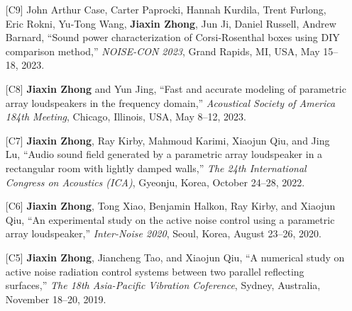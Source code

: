 \documentclass[10pt,a4paper,ragged2e,withhyper]{altacv}
\newcommand{\PubConference}[1]{\textit{#1}}
\newcommand{\PubTitle}[1]{``{#1,}''}
\newcommand{\PubMe}[1]{\textbf{#1}}
\begin{document}
\divider

\newpage
{}

\begin{itemize}[leftmargin = 25pt]
    \item [{[C9]}]
        John Arthur Case, Carter Paprocki, Hannah Kurdila, Trent Furlong, Eric Rokni, Yu-Tong
Wang, \PubMe{Jiaxin Zhong}, Jun Ji, Daniel Russell, Andrew Barnard,
        \PubTitle{Sound power characterization of Corsi-Rosenthal boxes using DIY comparison method}
        \PubConference{NOISE-CON 2023},
        Grand Rapids, MI, USA, May 15--18, 2023.
        \href{https://github.com/JiaxinZhong/JiaxinZhong.github.io/raw/master/publications/conference/Case2023-NoiseCon2023.pdf}{\color{accent}\faFilePdf[regular]}
    \item [{[C8]}]
        \PubMe{Jiaxin Zhong} and Yun Jing,
        \PubTitle{Fast and accurate modeling of parametric array loudspeakers in the frequency domain}
        \PubConference{Acoustical Society of America 184th Meeting},
        Chicago, Illinois, USA, May 8--12, 2023.
    \item[{[C7]}] 
        \PubMe{Jiaxin Zhong}, Ray Kirby, Mahmoud Karimi, Xiaojun Qiu, and Jing Lu,
        \PubTitle{Audio sound field generated by a parametric array loudspeaker in a rectangular room with lightly damped walls}
        \PubConference{The 24th International Congress on Acoustics (ICA)},
        Gyeonju, Korea, October 24--28, 2022.
        \href{https://github.com/JiaxinZhong/JiaxinZhong.github.io/raw/master/publications/conference/Zhong2022-ICA-PAL_room.pdf}{\color{accent}\faFilePdf[regular]}

    \item[{[C6]}] \PubMe{Jiaxin Zhong}, Tong Xiao, Benjamin Halkon, Ray Kirby, and Xiaojun Qiu,
        \PubTitle{An experimental study on the active noise control using a parametric array loudspeaker}
        \PubConference{Inter-Noise 2020},
        Seoul, Korea,
        August 23--26, 2020.
        \href{https://github.com/JiaxinZhong/JiaxinZhong.github.io/raw/master/publications/conference/Zhong2020-Internoise-PAL_ANC.pdf}{\color{accent}\faFilePdf[regular]}

    \item[{[C5]}] \PubMe{Jiaxin Zhong}, Jiancheng Tao, and Xiaojun Qiu,
        \PubTitle{A numerical study on active noise radiation control systems between two parallel reflecting surfaces}
        \PubConference{The 18th Asia-Pacific Vibration Coference},
        Sydney, Australia, 
        November 18--20, 2019.
        \href{https://github.com/JiaxinZhong/JiaxinZhong.github.io/raw/master/publications/conference/Zhong2019-APVC-ANC_parallel_surface.pdf}{\color{accent}\faFilePdf[regular]}


\end{itemize}
\end{document}
